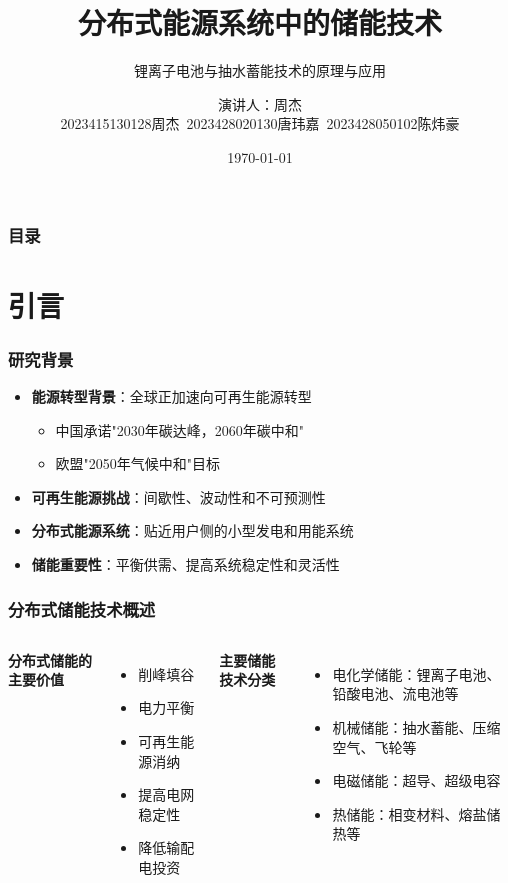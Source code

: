 \documentclass[aspectratio=169]{beamer}
\title{分布式能源系统中的储能技术}
\subtitle{锂离子电池与抽水蓄能技术的原理与应用}
\author{演讲人：周杰 \\ 2023415130128周杰~2023428020130唐玮嘉~2023428050102陈炜豪}
\institute{东莞理工学院\\化学工程与能源技术学院}
\date{\today}
\begin{document}
\begin{frame}
    \titlepage
\end{frame}

\begin{frame}
    \frametitle{目录}
    \tableofcontents
\end{frame}

\section{引言}
\begin{frame}
    \frametitle{研究背景}
    \begin{itemize}
        \item \textbf{能源转型背景}：全球正加速向可再生能源转型 \cite{ref1,ref3}
        \begin{itemize}
            \item 中国承诺"2030年碳达峰，2060年碳中和" \cite{ref1}
            \item 欧盟"2050年气候中和"目标 \cite{ref3}
        \end{itemize}
        \item \textbf{可再生能源挑战}：间歇性、波动性和不可预测性 \cite{ref4}
        \item \textbf{分布式能源系统}：贴近用户侧的小型发电和用能系统 \cite{ref5}
        \item \textbf{储能重要性}：平衡供需、提高系统稳定性和灵活性 \cite{ref2,ref6}
    \end{itemize}
\end{frame}

\begin{frame}
    \frametitle{分布式储能技术概述}
    \begin{columns}
        \textbf{分布式储能的主要价值}
        \begin{itemize}
            \item 削峰填谷
            \item 电力平衡
            \item 可再生能源消纳
            \item 提高电网稳定性
            \item 降低输配电投资
        \end{itemize}
        
        \textbf{主要储能技术分类}
        \begin{itemize}
            \item 电化学储能：锂离子电池、铅酸电池、流电池等
            \item 机械储能：抽水蓄能、压缩空气、飞轮等
            \item 电磁储能：超导、超级电容
            \item 热储能：相变材料、熔盐储热等
        \end{itemize}
    \end{columns}
\end{frame}
\end{document}
